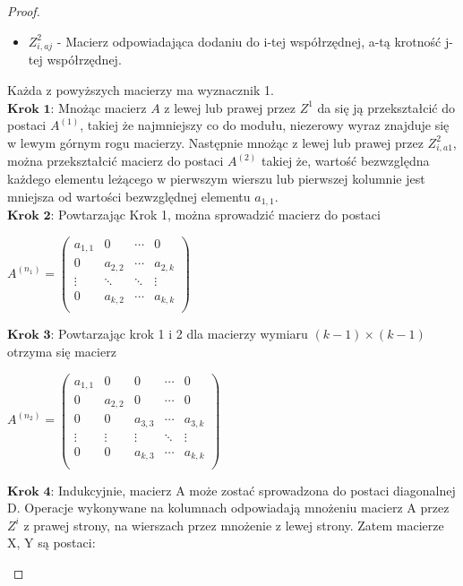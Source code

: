 \begin{proof}
\begin{itemize}
\item $Z^2_{i,aj}$ -  Macierz odpowiadająca dodaniu do  i-tej współrzędnej, a-tą krotność j-tej współrzędnej.
\end{itemize}
Każda z powyższych macierzy ma wyznacznik 1. \\
$\textbf{Krok 1:}$ Mnożąc macierz $A$ z lewej lub prawej przez $Z^1$ da się 
ją przekształcić do postaci $A^(1)$, takiej że najmniejszy co do modułu, niezerowy wyraz znajduje się w lewym górnym rogu macierzy. Następnie mnożąc z lewej lub prawej przez 
$Z^2_{i,a1}$, można przekształcić macierz do postaci $A^(2)$ takiej że, wartość bezwzględna każdego elementu leżącego w pierwszym wierszu lub pierwszej kolumnie jest mniejsza od wartości bezwzględnej elementu $a_{1,1}$. \\
$\textbf{Krok 2:}$ Powtarzając Krok 1, można sprowadzić macierz do postaci 
\begin{center}
$A^{(n_{1})}=\begin{pmatrix}
a_{1,1} & 0 & \cdots & 0 \\
0 & a_{2,2} & \cdots & a_{2,k} \\
\vdots & \ddots & \ddots & \vdots \\
0 & a_{k,2} & \cdots & a_{k,k} \\
\end{pmatrix}$
\end{center}
$\textbf{Krok 3:}$ Powtarzając krok 1 i 2 dla macierzy wymiaru $(k-1) \times (k-1)$ otrzyma się macierz 
\begin{center}
$A^{(n_{2})}=\begin{pmatrix}
a_{1,1} & 0 & 0 & \cdots & 0 \\
0 & a_{2,2} & 0 & \cdots & 0 \\
0 & 0 & a_{3,3} & \cdots & a_{3,k} \\
\vdots & \vdots & \vdots & \ddots  & \vdots \\
0 & 0 & a_{k,3} & \cdots & a_{k,k} \\
\end{pmatrix}$ \\
\end{center}
$\textbf{Krok 4:}$ Indukcyjnie, macierz A może zostać sprowadzona do postaci diagonalnej D. Operacje wykonywane na kolumnach odpowiadają mnożeniu macierz A przez $Z^i$ z prawej strony, na wierszach przez mnożenie z lewej strony. Zatem macierze X, Y są postaci: \\

	\begin{minipage}{0.5\textwidth}
	\begin{center}
	

\end{center}
\end{minipage}
\end{proof}
